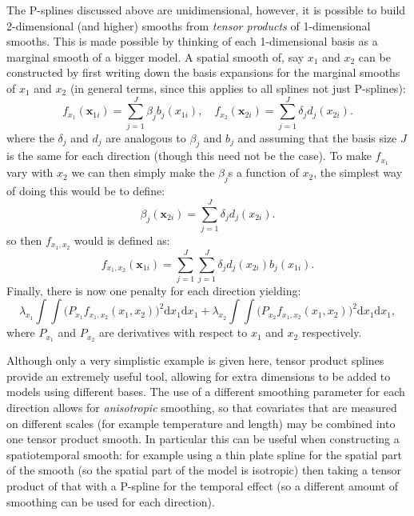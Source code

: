 The P-splines discussed above are unidimensional, however, it is possible to build 2-dimensional (and higher) smooths from \textit{tensor products} of 1-dimensional smooths. This is made possible by thinking of each 1-dimensional basis as a marginal smooth of a bigger model. A spatial smooth of, say $x_1$ and $x_2$ can be constructed by first writing down the basis expansions for the marginal smooths of $x_1$ and $x_2$ (in general terms, since this applies to all splines not just P-splines):
\begin{equation*}
f_{x_1}(\mathbf{x}_{1i}) = \sum_{j=1}^J \beta_j b_j(x_{1i}), \quad  f_{x_2}(\mathbf{x}_{2i}) = \sum_{j=1}^J \delta_j d_j(x_{2i}).
\end{equation*}
where the $\delta_j$ and $d_j$ are analogous to $\beta_j$ and $b_j$ and assuming that the basis size $J$ is the same for each direction (though this need not be the case). To make $f_{x_1}$ vary with $x_2$ we can then simply make the $\beta_j$s a function of $x_2$, the simplest way of doing this would be to define:
\begin{equation*}
\beta_j(\mathbf{x}_{2i}) = \sum_{j=1}^J \delta_j d_j(x_{2i}).
\end{equation*}
so then $f_{x_1,x_2}$ would is defined as:
\begin{equation*}
f_{x_1, x_2}(\mathbf{x}_{1i}) = \sum_{j=1}^J \sum_{j=1}^J \delta_j d_j(x_{2i}) b_j(x_{1i}).
\end{equation*}
Finally, there is now one penalty for each direction yielding:
\begin{equation*}
\lambda_{x_1} \int\int \Big(P_{x_1} f_{x_1, x_2}(x_1,x_2)\Big)^2 \text{d}x_1\text{d}x_1 + \lambda_{x_2} \int\int \Big(P_{x_2} f_{x_1, x_2}(x_1,x_2)\Big)^2 \text{d}x_1\text{d}x_1,
\end{equation*}
where $P_{x_1}$ and $P_{x_2}$ are derivatives with respect to $x_1$ and $x_2$ respectively. 

Although only a very simplistic example is given here, tensor product splines provide an extremely useful tool, allowing for extra dimensions to be added to models using different bases. The use of a different smoothing parameter for each direction allows for \textit{anisotropic} smoothing, so that covariates that are measured on different scales (for example temperature and length) may be combined into one tensor product smooth. In particular this can be useful when constructing a spatiotemporal smooth: for example using a thin plate spline for the spatial part of the smooth (so the spatial part of the model is isotropic) then taking a tensor product of that with a P-spline for the temporal effect (so a different amount of smoothing can be used for each direction).

